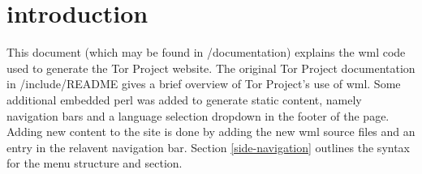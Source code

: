 \documentclass[11pt]{article}
\begin{document}
\section{introduction}
This document (which may be found in /documentation) explains the wml code used to generate the Tor Project website. The original Tor Project documentation in /include/README gives a brief overview of Tor Project's use of wml. Some additional embedded perl was added to generate static content, namely navigation bars and a language selection dropdown in the footer of the page. Adding new content to the site is done by adding the new wml source files and an entry in the relavent navigation bar. Section \ref{side-navigation} outlines the syntax for the menu structure and section.

%
%
%
%
\end{document}
